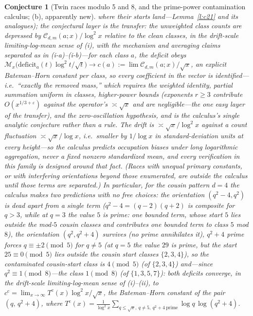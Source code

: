 \documentclass[11pt]{article}
\newtheorem{conjecture}{Conjecture}
\theoremstyle{definition}
\newcommand{\M}{\mathcal M}
\begin{document}
\begin{conjecture}[Twin races modulo 5 and 8, and the prime-power
contamination calculus; (b), apparently new]
where their starts land---Lemma~\ref{l:c21} and its analogues); the
conjectural layer is the transfer: the unweighted class counts are
depressed by $\mathcal C_{d,m}(a;x)/\log^2x$ relative to the clean
classes, in the drift-scale limiting-log-mean sense of (i), with the
mechanism and averaging claims separated as in (i-a)--(i-b)---for
each class $a$, the deficit obeys
$\M_x\bigl(\mathrm{deficit}_a(t)\log^2t/\sqrt t\bigr)\to
c(a):=\lim\mathcal C_{d,m}(a;x)/\sqrt x$, an explicit Bateman--Horn
constant per class, so every coefficient in the vector is
identified---i.e.\ ``exactly the removed
mass,'' which requires the weighted identity, partial summation
uniform in classes, higher-power bounds (exponents $r\ge3$
contribute $O(x^{1/3+\varepsilon})$ against the operator's
$\asymp\sqrt x$ and are negligible---the one easy layer of the
transfer), and the zero-oscillation
hypothesis, and is the calculus's single analytic conjecture rather than a
rule.  The drift is
$\asymp\sqrt x/\log^2x$ against a count fluctuation
$\asymp\sqrt x/\log x$, i.e.\ smaller by $1/\log x$ in
standard-deviation units at every height---so the calculus predicts
occupation biases under long logarithmic aggregation, never a fixed
nonzero standardized mean, and every verification in this family is
designed around that fact.  (Races with unequal primary
constants, or with interfering orientations beyond those enumerated,
are outside the calculus until those terms are separated.)  In
particular,
for the cousin pattern $d=4$ the calculus makes two predictions with
no free choices: the orientation $(q^2-4,q^2)$ is dead apart from a single term ($q^2-4=(q-2)(q+2)$ is composite for $q>3$, while at $q=3$ the value $5$ is prime: one bounded term, whose start $5$ lies outside the mod-$5$ cousin classes and contributes one bounded term to class $5$ mod $8$), the orientation $(q^2,q^2+4)$
survives (no prime annihilates it), $q^2+4$ prime forces
$q\equiv\pm2\pmod5$ for $q\neq5$ (at $q=5$ the value $29$ is prime,
but the start $25\equiv0\pmod5$ lies outside the cousin start classes
$\{2,3,4\}$), so the contaminated cousin-start class is
$4\pmod 5$ (of $\{2,3,4\}$) and---since $q^2\equiv1\pmod8$---the
class $1\pmod 8$ (of $\{1,3,5,7\}$): both deficits converge, in the
drift-scale limiting-log-mean sense of (i)--(ii), to
$c^{\mathrm c}=\lim_{x\to\infty}T^{\mathrm c}(x)\log^2x/\sqrt x$,
the Bateman--Horn constant of the pair $(q,\,q^2+4)$, where
$T^{\mathrm c}(x)=\frac1{\log^2x}\sum_{q\le\sqrt x,\ q\neq5,\ q^2+4\
\mathrm{prime}}\log q\,\log(q^2+4)$.
\end{conjecture}
\end{document}
